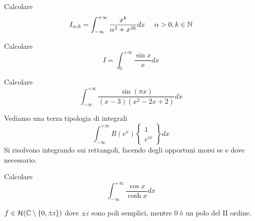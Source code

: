 \begin{figure}[htpb]
\end{figure}
\FloatBarrier
Calcolare
\begin{equation*}
I_{\alpha ,k} = \int ^{ + \infty }_{ - \infty }\frac{x^{k}}{\alpha ^{2} + x^{2k}} dx\ \ \ \ \alpha  > 0,k\in \NN 
\end{equation*}
\Esercizio{}

Calcolare
\begin{equation*}
I = \int ^{ + \infty }_{0}\frac{\sin x}{x} dx
\end{equation*}
\Esercizio{}

Calcolare
\begin{equation*}
\int ^{ + \infty }_{ - \infty }\frac{\sin\left(\pi x\right)}{\left(x - 3\right)\left(x^{2} - 2x + 2\right)} dx
\end{equation*}
\Esercizio{}

Vediamo una terza tipologia di integrali
\begin{equation*}
\boxed{\int ^{ + \infty }_{ - \infty } R\left(e^{x}\right)\left\{
\begin{array}{ c }
1\\
e^{ix}
\end{array}\right\} dx}
\end{equation*}
Si risolvono integrando sui rettangoli, facendo degli opportuni morsi se e dove necessario.

Calcolare
\begin{equation*}
\int ^{ + \infty }_{ - \infty }\frac{\cos x}{\cosh x} dx
\end{equation*}
\ParteSoluzioni
\Soluzione

$f\in \mathcal{H} (\mathbb{C}  \setminus \{0,\pm i\})$ dove $\pm i$ sono poli semplici, mentre $0$ è un polo del II ordine. 


